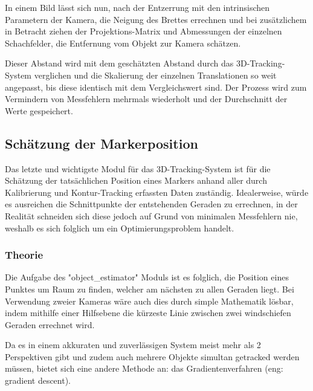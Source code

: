 \documentclass[12pt, ngerman]{article}
\begin{document}
In einem Bild lässt sich nun, nach der Entzerrung mit den intrinsischen
Parametern der Kamera, die Neigung des Brettes errechnen und bei zusätzlichem in
Betracht ziehen der Projektions-Matrix und Abmessungen der einzelnen
Schachfelder, die Entfernung vom Objekt zur Kamera schätzen.

Dieser Abstand wird mit dem geschätzten Abstand durch das 3D-Tracking-System
verglichen und die Skalierung der einzelnen Translationen so weit angepasst, bis
diese identisch mit dem Vergleichswert sind. Der Prozess wird zum Vermindern von
Messfehlern mehrmals wiederholt und der Durchschnitt der Werte gespeichert.

\subsection{Schätzung der Markerposition}
Das letzte und wichtigste Modul für das 3D-Tracking-System ist für die Schätzung der tatsächlichen Position eines Markers anhand aller durch Kalibrierung und Kontur-Tracking erfassten Daten zuständig. Idealerweise, würde es ausreichen die Schnittpunkte der entstehenden Geraden zu errechnen, in der Realität schneiden sich diese jedoch auf Grund von minimalen Messfehlern nie, weshalb es sich folglich um ein Optimierungsproblem handelt. 

\subsubsection{Theorie}
Die Aufgabe des "object\_estimator" Moduls ist es folglich, die Position eines Punktes um Raum zu finden, welcher am nächsten zu allen Geraden liegt. Bei Verwendung zweier Kameras wäre auch dies durch simple Mathematik lösbar, indem mithilfe einer Hilfsebene die kürzeste Linie zwischen zwei windschiefen Geraden errechnet wird.

Da es in einem akkuraten und zuverlässigen System meist mehr als 2 Perspektiven gibt und zudem auch mehrere Objekte simultan getracked werden müssen, bietet sich eine andere Methode an: das Gradientenverfahren (eng: gradient descent). 
\end{document}
